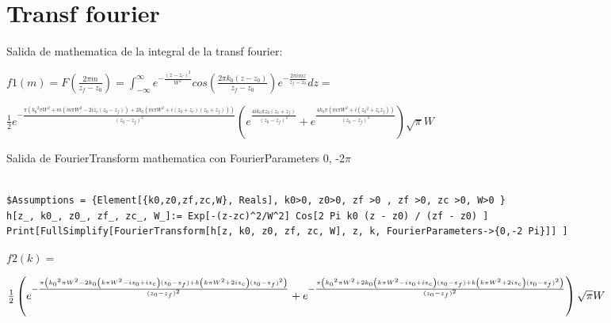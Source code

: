 \documentclass{article}
\begin{document}
\section{Transf fourier}

Salida de mathematica de la integral de la transf fourier:


$
f1(m)=F(  ) = \int_{- \infty}^{\infty}{e^{-} cos() e^{-} dz } = $

$ e^{-} \left(e^{}+e^{}\right) \sqrt{\pi } W$


Salida de FourierTransform mathematica con FourierParameters 0, -2$\pi$ 

\begin{verbatim}

$Assumptions = {Element[{k0,z0,zf,zc,W}, Reals], k0>0, z0>0, zf >0 , zf >0, zc >0, W>0 }
h[z_, k0_, z0_, zf_, zc_, W_]:= Exp[-(z-zc)^2/W^2] Cos[2 Pi k0 (z - z0) / (zf - z0) ]
Print[FullSimplify[FourierTransform[h[z, k0, z0, zf, zc, W], z, k, FourierParameters->{0,-2 Pi}]] ]

\end{verbatim}
$f2(k)=$

$\frac{1}{2} \left(e^{-\frac{\pi  \left(\text{$k_0$}^2 \pi  W^2-2 \text{$k_0$} \left(k \pi  W^2-i \text{$z_0$}+i \text{$z_c$}\right) (\text{$z_0$}-\text{$z_f$})+k
\left(k \pi  W^2+2 i \text{$z_c$}\right) (\text{$z_0$}-\text{$z_f$})^2\right)}{(\text{$z_0$}-\text{$z_f$})^2}}+ \\
e^{-\frac{\pi  \left(\text{$k_0$}^2 \pi  W^2+2 \text{$k_0$}
\left(k \pi  W^2-i \text{$z_0$}+i \text{$z_c$}\right) (\text{$z_0$}-\text{$z_f$})+k \left(k \pi  W^2+2 i \text{$z_c$}\right) (\text{$z_0$}-\text{$z_f$})^2\right)}{(\text{$z_0$}-\text{$z_f$})^2}}\right)
\sqrt{\pi } W$
\end{document}

